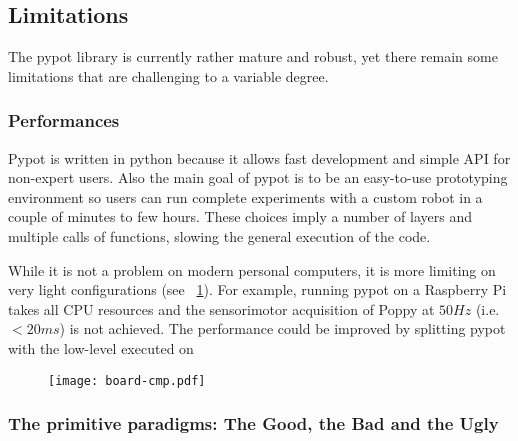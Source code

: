 \subsection{Limitations} %

The pypot library is currently rather mature and robust, yet there remain some limitations that are challenging to a variable degree.

\subsubsection{Performances}

Pypot is written in python because it allows fast development and simple API for non-expert users. Also the main goal of pypot is to be an easy-to-use prototyping environment so users can run complete experiments with a custom robot in a couple of minutes to few hours. These choices imply a number of layers and multiple calls of functions, slowing the general execution of the code.

While it is not a problem on modern personal computers, it is more limiting on very light configurations (see \figurename~\ref{fig:pypot-board-comparaison}). For example, running pypot on a Raspberry Pi takes all CPU resources and the sensorimotor acquisition of Poppy at $50Hz$ (i.e. $<20ms$) is not achieved.
The performance could be improved by splitting pypot with the low-level executed on

\begin{figure}[tb]
    \begin{center}
        \texttt{[image: board-cmp.pdf]}
    \end{center}
    \caption{}
    \label{fig:pypot-board-comparaison}
\end{figure}

\begin{figure}[tb]
\centering
    \hfil
    \caption{}
    \label{fig:pypot-run}
\end{figure}



\subsubsection{The primitive paradigms: The Good, the Bad and the Ugly}

